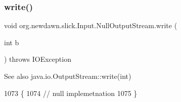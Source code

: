 \subsubsection{\texorpdfstring{write()}{write()}}
{\footnotesize\ttfamily void org.\+newdawn.\+slick.\+Input.\+Null\+Output\+Stream.\+write (\begin{DoxyParamCaption}\item[{int}]{b }\end{DoxyParamCaption}) throws I\+O\+Exception\hspace{0.3cm}{\ttfamily [inline]}}

\begin{DoxySeeAlso}{See also}
java.\+io.\+Output\+Stream\+::write(int) 
\end{DoxySeeAlso}

\begin{DoxyCode}
1073                                                     \{
1074             \textcolor{comment}{// null implemetnation}
1075         \}
\end{DoxyCode}
